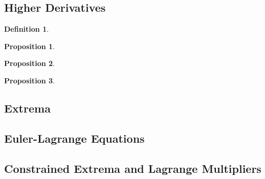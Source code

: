 \documentclass[letterpaper,twoside,12pt]{article}
\theoremstyle{mystyle}
\newtheorem{definition}{Definition}[section]
\newtheorem{prop}{Proposition}[section]
\begin{document}
\subsection{Higher Derivatives}

\begin{definition}
  
\end{definition}

\begin{prop}
  
\end{prop}

\begin{prop}
  
\end{prop}


\begin{prop}
  
\end{prop}





\subsection{Extrema}





\subsection{Euler-Lagrange Equations}





\subsection{Constrained Extrema and Lagrange Multipliers}
\end{document}
